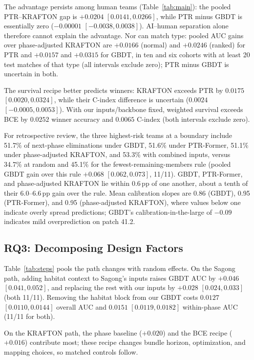 \documentclass[sigconf,anonymous,nonacm]{acmart}
\begin{document}
The advantage persists among human teams (Table~\ref{tab:main}): the pooled PTR--KRAFTON gap is $+0.0204$ $[0.0141,\allowbreak 0.0266]$, while PTR minus GBDT is essentially zero ($-0.00001$ $[-0.0038,\allowbreak 0.0038]$). AI--human separation alone therefore cannot explain the advantage. Nor can match type: pooled AUC gains over phase-adjusted KRAFTON are $+0.0166$ (normal) and $+0.0246$ (ranked) for PTR and $+0.0157$ and $+0.0315$ for GBDT, in ten and six cohorts with at least 20 test matches of that type (all intervals exclude zero); PTR minus GBDT is uncertain in both.

The survival recipe better predicts winners: KRAFTON exceeds PTR by $0.0175$ $[0.0020,\allowbreak 0.0324]$, while their C-index difference is uncertain ($0.0024$ $[-0.0005,\allowbreak 0.0053]$). With our inputs/backbone fixed, weighted survival exceeds BCE by $0.0252$ winner accuracy and $0.0065$ C-index (both intervals exclude zero).

For retrospective review, the three highest-risk teams at a boundary include 51.7\% of next-phase eliminations under GBDT, 51.6\% under PTR-Former, 51.1\% under phase-adjusted KRAFTON, and 53.3\% with combined inputs, versus 34.7\% at random and 45.1\% for the fewest-remaining-members rule (pooled GBDT gain over this rule $+0.068$ $[0.062,\allowbreak 0.073]$, 11/11). GBDT, PTR-Former, and phase-adjusted KRAFTON lie within 0.6\,pp of one another, about a tenth of their 6.0--6.6\,pp gain over the rule. Mean calibration slopes are 0.86 (GBDT), 0.95 (PTR-Former), and 0.95 (phase-adjusted KRAFTON), where values below one indicate overly spread predictions; GBDT's calibration-in-the-large of $-0.09$ indicates mild overprediction on patch 41.2.

\subsection{RQ3: Decomposing Design Factors}
\label{sec:results:rq3}


Table~\ref{tab:steps} pools the path changes with random effects. On the Sagong path, adding habitat context to Sagong's inputs raises GBDT AUC by $+0.046$ $[0.041,\allowbreak 0.052]$, and replacing the rest with our inputs by $+0.028$ $[0.024,\allowbreak 0.033]$ (both 11/11). Removing the habitat block from our GBDT costs $0.0127$ $[0.0110,\allowbreak 0.0144]$ overall AUC and $0.0151$ $[0.0119,\allowbreak 0.0182]$ within-phase AUC (11/11 for both).

On the KRAFTON path, the phase baseline ($+0.020$) and the BCE recipe ($+0.016$) contribute most; these recipe changes bundle horizon, optimization, and mapping choices, so matched controls follow.
\end{document}
